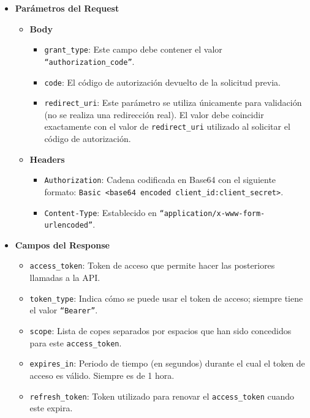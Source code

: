 \begin{itemize}
    \item \textbf{Parámetros del Request}
          \begin{itemize}
              \item \textbf{Body}
                    \begin{itemize}
                        \item \texttt{grant\_type}: Este campo debe contener el valor \texttt{``authorization\_code''}.
                        \item \texttt{code}: El código de autorización devuelto de la solicitud previa.
                        \item \texttt{redirect\_uri}: Este parámetro se utiliza únicamente para validación (no se realiza una redirección real). El valor debe coincidir exactamente con el valor de \texttt{redirect\_uri} utilizado al solicitar el código de autorización.
                    \end{itemize}
              \item \textbf{Headers}
                    \begin{itemize}
                        \item \texttt{Authorization}: Cadena codificada en Base64 con el siguiente formato: \texttt{Basic <base64 encoded client\_id:client\_secret>}.
                        \item \texttt{Content-Type}: Establecido en \texttt{``application/x-www-form-urlencoded''}.
                    \end{itemize}
          \end{itemize}
    \item \textbf{Campos del Response}
          \begin{itemize}
              \item \texttt{access\_token}: Token de acceso que permite hacer las posteriores llamadas a la API.
              \item \texttt{token\_type}: Indica cómo se puede usar el token de acceso; siempre tiene el valor \texttt{``Bearer''}.
              \item \texttt{scope}: Lista de copes separados por espacios que han sido concedidos para este \texttt{access\_token}.
              \item \texttt{expires\_in}: Periodo de tiempo (en segundos) durante el cual el token de acceso es válido. Siempre es de 1 hora.
              \item \texttt{refresh\_token}: Token utilizado para renovar el \texttt{access\_token} cuando este expira.
          \end{itemize}
\end{itemize}

